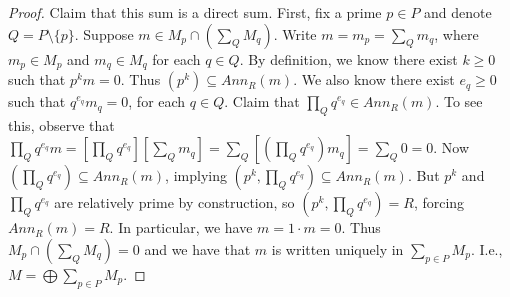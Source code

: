 \documentclass[8pt]{amsart}
\theoremstyle{plain}%
\theoremstyle{definition}
\theoremstyle{remark}
\numberwithin{equation}{section}
\begin{document}
\begin{enumerate}
\begin{proof}
		Claim that this sum is a direct sum. First, fix a prime $p\in P$ and denote $Q = P \setminus \{p\}$. Suppose $m \in M_{p} \cap (\sum_Q M_q)$. Write $m = m_{p} = \sum_Qm_q$, where $m_{p} \in M_{p}$ and $m_q \in M_q$ for each $q \in Q$. By definition, we know there exist $k \geq 0$ such that $p^km = 0$. Thus $(p^k) \subseteq Ann_R(m)$. We also know there exist $e_q \geq 0$ such that $q^{e_q}m_q = 0$, for each $q \in Q$. Claim that $\prod_Q q^{e_q} \in Ann_R(m)$. To see this, observe that $\prod_Qq^{e_q}m = [\prod_Qq^{e_q}][\sum_Qm_q] = \sum_Q[(\prod_Qq^{e_q})m_q] = \sum_Q 0 = 0$. Now $(\prod_Q q^{e_q}) \subseteq Ann_R(m)$, implying $(p^k, \prod_Q q^{e_q}) \subseteq Ann_R(m)$. But $p^k$ and $\prod_Q q^{e_q}$ are relatively prime by construction, so $(p^k, \prod_Q q^{e_q}) = R$, forcing $Ann_R(m) = R$. In particular, we have $m = 1\cdot m = 0$. Thus $M_{p} \cap (\sum_Q M_q) = 0$ and we have that $m$ is written uniquely in $\sum_{p \in P} M_p$. I.e., $M = \bigoplus\sum_{p \in P} M_p$.
		
		\end{proof}
		
	\end{enumerate}
\end{document}
